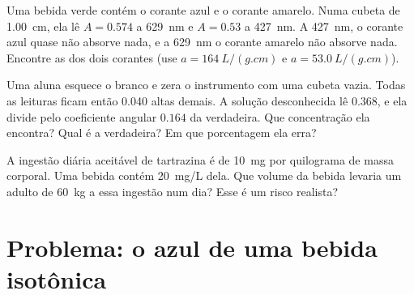 \begin{exercise}[$\star\star\star$]\label{exo:g11:absorbance:13}
Uma bebida verde contém o corante azul e o corante amarelo. Numa cubeta
de \qty{1.00}{cm}, ela lê $A = 0.574$ a \qty{629}{nm} e $A = 0.53$ a
\qty{427}{nm}. A \qty{427}{nm}, o corante azul quase não absorve nada,
e a \qty{629}{nm} o corante amarelo não absorve nada. Encontre as
 dos dois corantes (use $a = \qty{164}{L/(g.cm)}$
e $a = \qty{53.0}{L/(g.cm)}$).
\end{exercise}

\begin{exercise}[$\star\star\star$]\label{exo:g11:absorbance:14}
Uma aluna esquece o branco e zera o instrumento com uma cubeta vazia.
Todas as leituras ficam então \num{0.040} altas demais. A solução
desconhecida lê $0.368$, e ela divide pelo coeficiente angular $0.164$
da  verdadeira. Que concentração ela encontra? Qual é
a verdadeira? Em que porcentagem ela erra?
\end{exercise}

\begin{exercise}[$\star\star\star$]\label{exo:g11:absorbance:15}
A ingestão diária aceitável de tartrazina é de \qty{10}{mg} por
quilograma de massa corporal. Uma bebida contém \qty{20}{mg/L} dela. Que
volume da bebida levaria um adulto de \qty{60}{kg} a essa ingestão num
dia? Esse é um risco realista?
\end{exercise}

\section{Problema: o azul de uma bebida isotônica}


